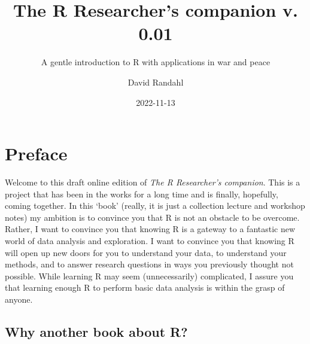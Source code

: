 \documentclass[
]{book}
\title{The R Researcher's companion v. 0.01}
\subtitle{A gentle introduction to R with applications in war and peace}
\author{David Randahl}
\date{2022-11-13}
\begin{document}
\maketitle

{
\setcounter{tocdepth}{1}
\tableofcontents
}
\hypertarget{preface}{%
\chapter*{Preface}\label{preface}}

Welcome to this draft online edition of \emph{The R Researcher's companion}. This is a project that has been in the works for a long time and is finally, hopefully, coming together. In this `book' (really, it is just a collection lecture and workshop notes) my ambition is to convince you that R is not an obstacle to be overcome. Rather, I want to convince you that knowing R is a gateway to a fantastic new world of data analysis and exploration. I want to convince you that knowing R will open up new doors for you to understand your data, to understand your methods, and to answer research questions in ways you previously thought not possible. While learning R may seem (unnecessarily) complicated, I assure you that learning enough R to perform basic data analysis is within the grasp of anyone.

\hypertarget{why-another-book-about-r}{%
\section*{Why another book about R?}\label{why-another-book-about-r}}
\end{document}
